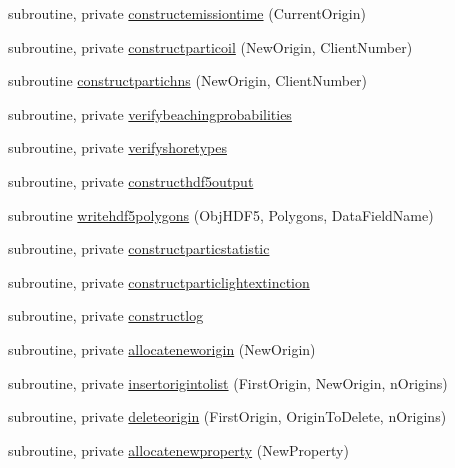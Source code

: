 \begin{DoxyCompactItemize}
\item 
subroutine, private \mbox{\hyperlink{namespacemodulelagrangianglobal_a13d67d5bfe97a6d21e41748215a9fd5c}{constructemissiontime}} (Current\+Origin)
\item 
subroutine, private \mbox{\hyperlink{namespacemodulelagrangianglobal_a070a6d8670eb489aaa0ce90aba70b1cc}{constructparticoil}} (New\+Origin, Client\+Number)
\item 
subroutine \mbox{\hyperlink{namespacemodulelagrangianglobal_ab6e9439dc837db2093ed5e4108e57726}{constructpartichns}} (New\+Origin, Client\+Number)
\item 
subroutine, private \mbox{\hyperlink{namespacemodulelagrangianglobal_aee31fff31d61d2bd1593396996588917}{verifybeachingprobabilities}}
\item 
subroutine, private \mbox{\hyperlink{namespacemodulelagrangianglobal_a5abbe7b9c24cce4b55bf9e30a7bb418a}{verifyshoretypes}}
\item 
subroutine, private \mbox{\hyperlink{namespacemodulelagrangianglobal_a72385af4d9a1a57607853866a0eb0fe0}{constructhdf5output}}
\item 
subroutine \mbox{\hyperlink{namespacemodulelagrangianglobal_a123df5d7675f21137327cf36ed875f91}{writehdf5polygons}} (Obj\+H\+D\+F5, Polygons, Data\+Field\+Name)
\item 
subroutine, private \mbox{\hyperlink{namespacemodulelagrangianglobal_a13c381524822a2310bb011dc1680ed61}{constructparticstatistic}}
\item 
subroutine, private \mbox{\hyperlink{namespacemodulelagrangianglobal_a4ba42e3d7ac7a48f0a6a551322aaf754}{constructparticlightextinction}}
\item 
subroutine, private \mbox{\hyperlink{namespacemodulelagrangianglobal_aa700601bd9f8ad04a50534e66725efc4}{constructlog}}
\item 
subroutine, private \mbox{\hyperlink{namespacemodulelagrangianglobal_a537c7269309c583343ae41dfe244a2b0}{allocateneworigin}} (New\+Origin)
\item 
subroutine, private \mbox{\hyperlink{namespacemodulelagrangianglobal_ab902fc69902a11b86ed8b0b64ece38d9}{insertorigintolist}} (First\+Origin, New\+Origin, n\+Origins)
\item 
subroutine, private \mbox{\hyperlink{namespacemodulelagrangianglobal_a47b61d17a8d0a48abe9ccb2937d67a93}{deleteorigin}} (First\+Origin, Origin\+To\+Delete, n\+Origins)
\item 
subroutine, private \mbox{\hyperlink{namespacemodulelagrangianglobal_aa537bff97afb419645e62f2b096b2e56}{allocatenewproperty}} (New\+Property)

\end{DoxyCompactItemize}
